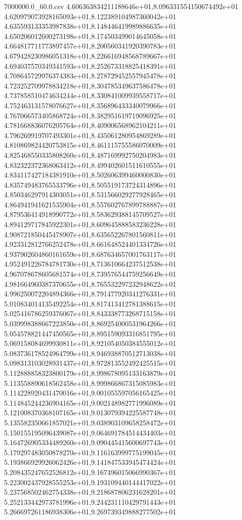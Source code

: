 \begin{filecontents*}{7000000.0_60.0.csv}
4.606363834211188646e+01,8.096331554150674492e+01
4.620979073928165093e+01,8.122389104987360042e+01
4.635593133353987838e+01,8.148446419989886635e+01
4.650206012600273198e+01,8.174503499014645058e+01
4.664817711773897457e+01,8.200560341920390783e+01
4.679428230986051318e+01,8.226616948568789667e+01
4.694037570349341593e+01,8.252673318825418391e+01
4.708645729976374383e+01,8.278729452557945478e+01
4.723252709978834218e+01,8.304785349637586478e+01
4.737858510474634244e+01,8.330841009939558717e+01
4.752463131578076627e+01,8.356896433340079966e+01
4.767066573405868724e+01,8.382951619719096925e+01
4.781668836076205764e+01,8.409006568962104211e+01
4.796269919707493301e+01,8.435061280954869289e+01
4.810869824420753815e+01,8.461115755586070009e+01
4.825468550335808260e+01,8.487169992750204983e+01
4.832322372368063412e+01,8.499402601511610555e+01
4.834117427184381910e+01,8.502606399460000830e+01
4.835749483765533796e+01,8.505519173724314896e+01
4.850346297914303051e+01,8.531566029277928465e+01
4.864941941621535904e+01,8.557602767899788887e+01
4.879536414918990772e+01,8.583629388145709527e+01
4.894129717845922301e+01,8.609645888583236228e+01
4.908721850445478907e+01,8.635652267801560811e+01
4.923312812766252478e+01,8.661648524401334726e+01
4.937902604860161659e+01,8.687634657001763117e+01
4.952491226784781730e+01,8.713610664237512538e+01
4.967078678605681574e+01,8.739576544759256649e+01
4.981664960387370655e+01,8.765532297232948622e+01
4.996250072204894366e+01,8.791477920341276331e+01
5.010834014135492254e+01,8.817413412781388615e+01
5.025416786259376067e+01,8.843338773268715158e+01
5.039998388667223850e+01,8.869254000531964266e+01
5.054578821447450565e+01,8.895159093316851795e+01
5.069158084699930811e+01,8.921054050384555012e+01
5.083736178524964799e+01,8.946938870512713038e+01
5.098313103028931437e+01,8.972813552492425515e+01
5.112888858323800179e+01,8.998678095133163879e+01
5.113558890618562458e+01,8.999866867315085983e+01
5.114228920431470016e+01,9.001055597056165425e+01
5.114845244236904165e+01,9.002148982771996089e+01
5.121008370368107165e+01,9.013079394225587748e+01
5.135582350661857021e+01,9.038903109658258472e+01
5.150155195096439087e+01,9.064691784514434403e+01
5.164726905334489260e+01,9.090445415600697743e+01
5.179297483050878270e+01,9.116163999775199045e+01
5.193866929926062426e+01,9.141847533945474424e+01
5.208435247652526812e+01,9.167496015066990367e+01
5.223002437928555253e+01,9.193109440144417022e+01
5.237568502462754338e+01,9.218687806231628201e+01
5.252133442973781996e+01,9.244231110429791443e+01
5.266697261186938306e+01,9.269739349888277502e+01

\end{filecontents*}
